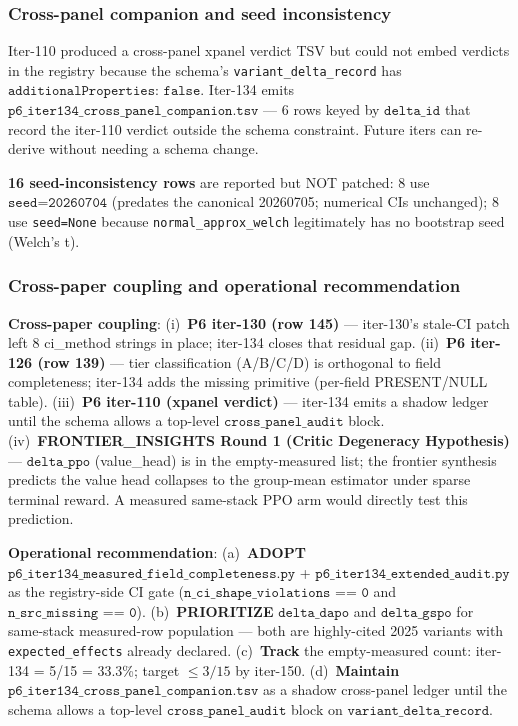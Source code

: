 \documentclass{article}
\begin{document}
\subsubsection{Cross-panel companion and seed inconsistency}
\label{sec:p6-iter134-xpanel-companion}

Iter-110 produced a cross-panel xpanel verdict TSV but could not embed
verdicts in the registry because the schema's
\texttt{variant\_delta\_record} has $\texttt{additionalProperties: false}$.
Iter-134 emits
$\texttt{p6\_iter134\_cross\_panel\_companion.tsv}$ --- 6 rows keyed by
$\texttt{delta\_id}$ that record the iter-110 verdict outside the schema
constraint. Future iters can re-derive without needing a schema change.

\textbf{16 seed-inconsistency rows} are reported but NOT patched: 8 use
$\texttt{seed=20260704}$ (predates the canonical 20260705; numerical CIs
unchanged); 8 use \texttt{seed=None} because \texttt{normal\_approx\_welch}
legitimately has no bootstrap seed (Welch's t).

\subsubsection{Cross-paper coupling and operational recommendation}
\label{sec:p6-iter134-coupling}

\textbf{Cross-paper coupling}:
(i)~\textbf{P6 iter-130 (row 145)} --- iter-130's stale-CI patch left 8
ci\_method strings in place; iter-134 closes that residual gap.
(ii)~\textbf{P6 iter-126 (row 139)} --- tier classification (A/B/C/D) is
orthogonal to field completeness; iter-134 adds the missing primitive
(per-field PRESENT/NULL table).
(iii)~\textbf{P6 iter-110 (xpanel verdict)} --- iter-134 emits a shadow
ledger until the schema allows a top-level $\texttt{cross\_panel\_audit}$
block.
(iv)~\textbf{FRONTIER\_INSIGHTS Round 1 (Critic Degeneracy Hypothesis)} ---
$\texttt{delta\_ppo}$ (value\_head) is in the empty-measured list; the
frontier synthesis predicts the value head collapses to the group-mean
estimator under sparse terminal reward. A measured same-stack PPO arm
would directly test this prediction.

\textbf{Operational recommendation}:
(a)~\textbf{ADOPT} $\texttt{p6\_iter134\_measured\_field\_completeness.py}$
+ $\texttt{p6\_iter134\_extended\_audit.py}$ as the registry-side CI gate
($\texttt{n\_ci\_shape\_violations == 0}$ and
$\texttt{n\_src\_missing == 0}$).
(b)~\textbf{PRIORITIZE} $\texttt{delta\_dapo}$ and $\texttt{delta\_gspo}$
for same-stack measured-row population --- both are highly-cited 2025
variants with \texttt{expected\_effects} already declared.
(c)~\textbf{Track} the empty-measured count: iter-134 = 5/15 = 33.3\%;
target $\leq 3/15$ by iter-150.
(d)~\textbf{Maintain} $\texttt{p6\_iter134\_cross\_panel\_companion.tsv}$
as a shadow cross-panel ledger until the schema allows a top-level
$\texttt{cross\_panel\_audit}$ block on $\texttt{variant\_delta\_record}$. 
\end{document}
